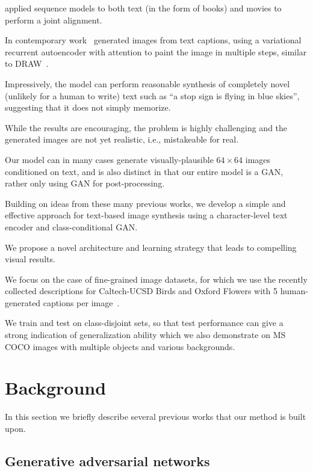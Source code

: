 \citet{zhu2015aligning} applied sequence models to both text (in the form of books) and movies to perform a joint alignment.

In contemporary work~\citet{mansimov2015generating} generated images from text captions, using a variational recurrent autoencoder with attention to paint the image in multiple steps, similar to DRAW~\cite{gregor2015draw}.

Impressively, the model can perform reasonable synthesis of completely novel (unlikely for a human to write) text such as ``a stop sign is flying in blue skies'', suggesting that it does not simply memorize.

While the results are encouraging, the problem is highly challenging and the generated images are not yet realistic, i.e., mistakeable for real.

Our model can in many cases generate visually-plausible $64 \times 64$ images conditioned on text, and is also distinct in that our entire model is a GAN, rather only using GAN for post-processing.

Building on ideas from these many previous works, we develop a simple and effective approach for text-based image synthesis using a character-level text encoder and class-conditional GAN.

We propose a novel architecture and learning strategy that leads to compelling visual results.

We focus on the case of fine-grained image datasets, for which we use the recently collected descriptions for Caltech-UCSD Birds and Oxford Flowers with 5 human-generated captions per image~\cite{reed2015learning}.

We train and test on class-disjoint sets, so that test performance can give a strong indication of generalization ability which we also demonstrate on MS COCO images with multiple objects and various backgrounds.

\section{Background}

In this section we briefly describe several previous works that our method is built upon. 

\subsection{Generative adversarial networks}
\label{preliminary_gan}

